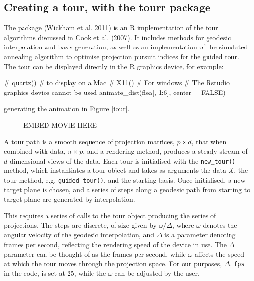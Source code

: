 \subsection{Creating a tour, with the tourr
package}\label{creating-a-tour-with-the-tourr-package}

The  package (Wickham et al.
\protect\hyperlink{ref-tourr}{2011}) is an R implementation of the tour
algorithms discussed in Cook et al.
(\protect\hyperlink{ref-gt_pp_mc}{2007}). It includes methods for
geodesic interpolation and basis generation, as well as an
implementation of the simulated annealing algorithm to optimise
projection pursuit indices for the guided tour. The tour can be
displayed directly in the R graphics device, for example:

\begin{Schunk}
\begin{Sinput}
# quartz() # to display on a Mac
# X11() # For windows
# The Rstudio graphics device cannot be used
animate_dist(flea[, 1:6], center = FALSE)
\end{Sinput}
\end{Schunk}

generating the animation in Figure \ref{tour}.

\begin{figure}[ht]
EMBED MOVIE HERE
\end{figure}

A tour path is a smooth sequence of projection matrices, \(p\times d\),
that when combined with data, \(n\times p\), and a rendering method,
produces a steady stream of \(d\)-dimensional views of the data. Each
tour is initialised with the \texttt{new\_tour()} method, which
instantiates a tour object and takes as arguments the data \(X\), the
tour method, e.g. \texttt{guided\_tour()}, and the starting basis. Once
initialised, a new target plane is chosen, and a series of steps along a
geodesic path from starting to target plane are generated by
interpolation.

This requires a series of calls to the tour object producing the series
of projections. The steps are discrete, of size given by
\(\omega/\Delta\), where \(\omega\) denotes the angular velocity of the
geodesic interpolation, and \(\Delta\) is a parameter denoting frames
per second, reflecting the rendering speed of the device in use. The
\(\Delta\) parameter can be thought of as the frames per second, while
\(\omega\) affects the speed at which the tour moves through the
projection space. For our purposes, \(\Delta\), \texttt{fps} in the
code, is set at 25, while the \(\omega\) can be adjusted by the user.

